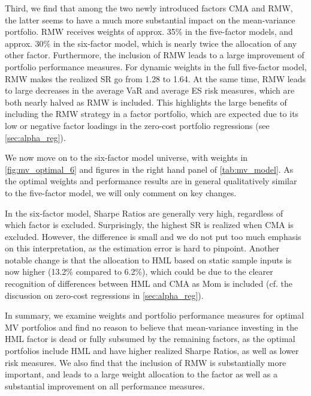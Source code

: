 Third, we find that among the two newly introduced factors CMA and RMW, the latter seems to have a much more substantial impact on the mean-variance portfolio. RMW receives weights of approx. 35\% in the five-factor models, and approx. 30\% in the six-factor model, which is nearly twice the allocation of any other factor. Furthermore, the inclusion of RMW leads to a large improvement of portfolio performance measures. For dynamic weights in the full five-factor model, RMW makes the realized SR go from 1.28 to 1.64. At the same time, RMW leads to large decreases in the average VaR and average ES risk measures, which are both nearly halved as RMW is included. This highlights the large benefits of including the RMW strategy in a factor portfolio, which are expected due to its low or negative factor loadings in the zero-cost portfolio regressions (see \autoref{sec:alpha_reg}).

We now move on to the six-factor model universe, with weights in \autoref{fig:mv_optimal_6} and figures in the right hand panel of \autoref{tab:mv_model}. As the optimal weights and performance results are in general qualitatively similar to the five-factor model, we will only comment on key changes.

In the six-factor model, Sharpe Ratios are generally very high, regardless of which factor is excluded. Surprisingly, the highest SR is realized when CMA is excluded. However, the difference is small and we do not put too much emphasis on this interpretation, as the estimation error is hard to pinpoint. Another notable change is that the allocation to HML based on static sample inputs is now higher (13.2\% compared to 6.2\%), which could be due to the clearer recognition of differences between HML and CMA as Mom is included (cf. the discussion on zero-cost regressions in \autoref{sec:alpha_reg}). 

In summary, we examine weights and portfolio performance measures for optimal MV portfolios and find no reason to believe that mean-variance investing in the HML factor is dead or fully subsumed by the remaining factors, as the optimal portfolios include HML and have higher realized Sharpe Ratios, as well as lower risk measures. We also find that the inclusion of RMW is substantially more important, and leads to a large weight allocation to the factor as well as a substantial improvement on all performance measures.

